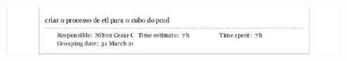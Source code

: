 \begin{apendicesenv}
\begin{figure}[h!]
\centering
\includegraphics[keepaspectratio=false,scale=0.60]{figuras/figuras_nilton/kanban5.eps}
\end{figure}

\end{apendicesenv}